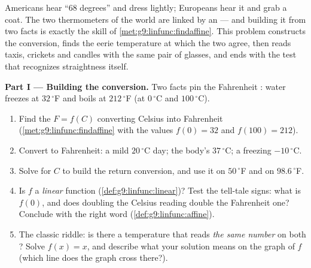 \begin{problem}
\label{pb:g9:linfunc:1}
Americans hear ``$68$ degrees'' and dress lightly; Europeans hear
it and grab a coat. The two thermometers of the world are linked
by an  --- and building it from two facts is
exactly the skill of \cref{met:g9:linfunc:findaffine}. This
problem constructs the conversion, finds the eerie temperature at
which the two  agree, then reads taxis, crickets and
candles with the same pair of glasses, and ends with the test
that recognizes straightness itself.

\medskip
\noindent\textbf{Part I --- Building the conversion.}
Two facts pin the Fahrenheit : water freezes at
$32\,^\circ$F and boils at $212\,^\circ$F (at $0\,^\circ$C and
$100\,^\circ$C).
\begin{enumerate}
  \item Find the  $F = f(C)$ converting Celsius
        into Fahrenheit (\cref{met:g9:linfunc:findaffine} with
        the values $f(0) = 32$ and $f(100) = 212$).
  \item Convert to Fahrenheit: a mild $20\,^\circ$C day; the
        body's $37\,^\circ$C; a freezing $-10\,^\circ$C.
  \item Solve for $C$ to build the return conversion, and use it
        on $50\,^\circ$F and on $98.6\,^\circ$F.
  \item Is $f$ a \emph{linear} function
        (\cref{def:g9:linfunc:linear})? Test the tell-tale signs:
        what is $f(0)$, and does doubling the Celsius reading
        double the Fahrenheit one? Conclude with the right word
        (\cref{def:g9:linfunc:affine}).
  \item The classic riddle: is there a temperature that reads
        \emph{the same number} on both ? Solve
        $f(x) = x$, and describe what your solution means on the
        graph of $f$ (which line does the graph cross there?).
\end{enumerate}


\end{problem}
